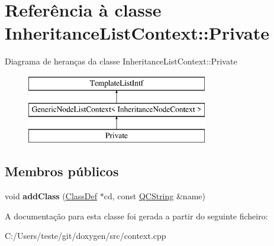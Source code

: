 \hypertarget{class_inheritance_list_context_1_1_private}{\section{Referência à classe Inheritance\-List\-Context\-:\-:Private}
\label{class_inheritance_list_context_1_1_private}
}
Diagrama de heranças da classe Inheritance\-List\-Context\-:\-:Private\begin{figure}[H]
\begin{center}
\leavevmode
\includegraphics[height=3.000000cm]{class_inheritance_list_context_1_1_private}
\end{center}
\end{figure}
\subsection*{Membros públicos}
\begin{DoxyCompactItemize}
\item 
\hypertarget{class_inheritance_list_context_1_1_private_a432a9ac8085597646590d4799006e98f}{void {\bfseries add\-Class} (\hyperlink{class_class_def}{Class\-Def} $\ast$cd, const \hyperlink{class_q_c_string}{Q\-C\-String} \&name)}\label{class_inheritance_list_context_1_1_private_a432a9ac8085597646590d4799006e98f}

\end{DoxyCompactItemize}


A documentação para esta classe foi gerada a partir do seguinte ficheiro\-:\begin{DoxyCompactItemize}
\item 
C\-:/\-Users/teste/git/doxygen/src/context.\-cpp\end{DoxyCompactItemize}
